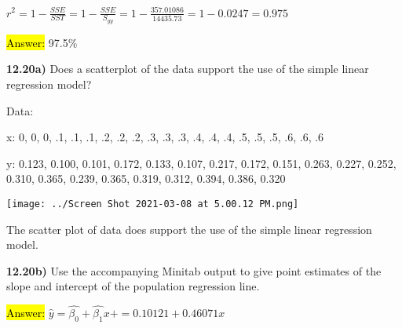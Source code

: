 \documentclass{article}
\begin{document}
\vspace{2mm}

$r^{2}=1-\frac{SSE}{SST}=1-\frac{SSE}{S_{yy}}=1-\frac{357.01086}{14435.73}=1-0.0247=0.975$

\vspace{2mm}

\hl{Answer:} 97.5\%









\newpage
\textbf{12.20a)} Does a scatterplot of the data support the use of the simple linear regression model?

\vspace{2mm}

Data:

\vspace{2mm}

x: 0, 0, 0, .1, .1, .1, .2, .2, .2, .3, .3, .3, .4, .4, .4, .5, .5, .5, .6, .6, .6

\vspace{2mm}

y: 0.123, 0.100, 0.101, 0.172, 0.133, 0.107, 0.217, 0.172, 0.151, 0.263, 0.227, 0.252, 0.310, 0.365, 0.239, 0.365, 0.319, 0.312, 0.394, 0.386, 0.320

\vspace{2mm}


\texttt{[image: ../Screen Shot 2021-03-08 at 5.00.12 PM.png]}

\vspace{2mm}

The scatter plot of data does support the use of the simple linear regression model.


\vspace{5mm}


\textbf{12.20b)} Use the accompanying Minitab output to give point estimates of the slope and intercept of the population regression line.

\vspace{2mm}


\hl{Answer:} $\hat{y}=\hat{\beta_{0}}+\hat{\beta_{1}}x+=0.10121+0.46071x$






\vspace{5mm}

\vspace{5mm}
\end{document}
